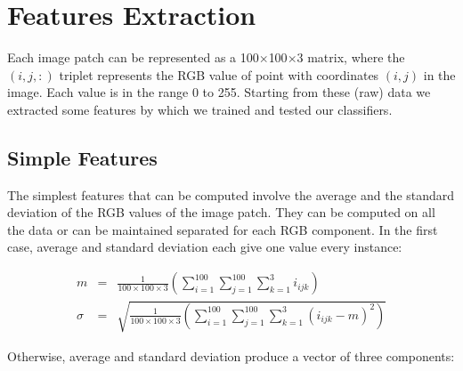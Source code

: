 \vspace{0.5cm}




\section{Features Extraction}
\label{ch4:FE}

Each image patch can be represented as a 100$\times$100$\times$3 matrix, where the $(i,j,:)$ triplet represents the RGB value of point with coordinates $(i,j)$ in the image.
Each value is in the range 0 to 255. Starting from these (raw) data we extracted some features by which we trained and tested our classifiers.

\vspace{0.5cm}

\subsection{Simple Features}

The simplest features that can be computed involve the average and the standard deviation of the \Gls{RGB} values of the image patch. They can be computed on all the data or can be maintained separated
for each \Gls{RGB} component. In the first case, average and standard deviation each give one value every instance:

\begin{eqnarray}
 m & = & \frac{1}{100\times100\times3} \left( \sum_{i=1}^{100} \sum_{j=1}^{100} \sum_{k=1}^{3} i_{ijk} \right) \\
 \sigma & = & \sqrt{\frac{1}{100\times100\times3} \left( \sum_{i=1}^{100} \sum_{j=1}^{100} \sum_{k=1}^{3} (i_{ijk} - m )^2 \right)}
\end{eqnarray}

Otherwise, average and standard deviation produce a vector of three components:

